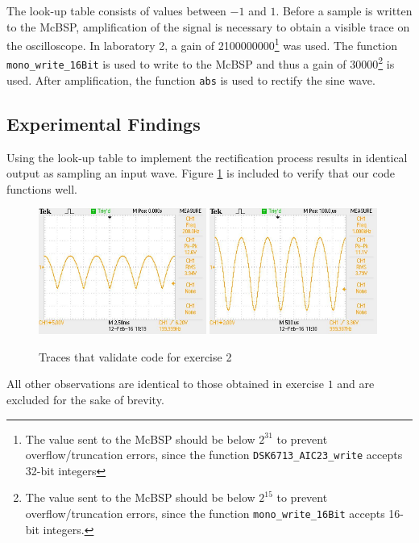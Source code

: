 \documentclass{article}
\begin{document}
The look-up table consists of values between $-1$ and $1$. Before a sample is written to the McBSP, amplification of the signal is necessary to obtain a visible trace on the oscilloscope. In laboratory 2, a gain of 2100000000\footnote{The value sent to the McBSP should be below $2^{31}$ to prevent overflow/truncation errors, since the function {\tt DSK6713\_AIC23\_write} accepts 32-bit integers} was used. The function {\tt mono\_write\_16Bit} is used to write to the McBSP and thus a gain of $30000$\footnote{The value sent to the McBSP should be below $2^{15}$ to prevent overflow/truncation errors, since the function {\tt mono\_write\_16Bit} accepts 16-bit integers.} is used. After amplification, the function {\tt abs} is used to rectify the sine wave.

\subsection{Experimental Findings}
Using the look-up table to implement the rectification process results in identical output as sampling an input wave. Figure \ref{fig:exercise_2} is included to verify that our code functions well.

\begin{figure}[H]
    \centering
    \includegraphics[width=0.49\textwidth]{ex2_2.jpg}
    \includegraphics[width=0.49\textwidth]{ex2.jpg}
    \caption{Traces that validate code for exercise 2}
    \label{fig:exercise_2}
\end{figure}

All other observations are identical to those obtained in exercise $1$ and are excluded for the sake of brevity. 
\end{document}
